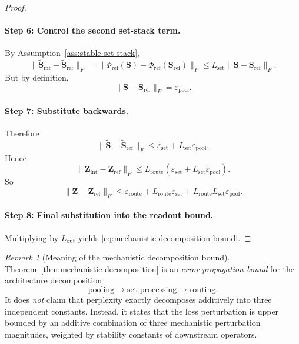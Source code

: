 \documentclass{article}
\theoremstyle{plain}
\theoremstyle{definition}
\theoremstyle{remark}
\newtheorem{remark}[theorem]{Remark}
\begin{document}
\begin{proof}
\paragraph{Step 6: Control the second set-stack term.}
By Assumption~\ref{ass:stable-set-stack},
\[
\|\tilde{\mathbf{S}}_{\mathrm{int}}-\tilde{\mathbf{S}}_{\mathrm{ref}}\|_F
=
\|\Phi_{\mathrm{ref}}(\mathbf{S})-\Phi_{\mathrm{ref}}(\mathbf{S}_{\mathrm{ref}})\|_F
\le
L_{\mathrm{set}}
\|\mathbf{S}-\mathbf{S}_{\mathrm{ref}}\|_F.
\]
But by definition,
\[
\|\mathbf{S}-\mathbf{S}_{\mathrm{ref}}\|_F
=
\varepsilon_{\mathrm{pool}}.
\]

\paragraph{Step 7: Substitute backwards.}
Therefore
\[
\|\tilde{\mathbf{S}}-\tilde{\mathbf{S}}_{\mathrm{ref}}\|_F
\le
\varepsilon_{\mathrm{set}} + L_{\mathrm{set}}\varepsilon_{\mathrm{pool}}.
\]
Hence
\[
\|\mathbf{Z}_{\mathrm{int}}-\mathbf{Z}_{\mathrm{ref}}\|_F
\le
L_{\mathrm{route}}
\left(
\varepsilon_{\mathrm{set}} + L_{\mathrm{set}}\varepsilon_{\mathrm{pool}}
\right).
\]
So
\[
\|\mathbf{Z}-\mathbf{Z}_{\mathrm{ref}}\|_F
\le
\varepsilon_{\mathrm{route}}
+
L_{\mathrm{route}}\varepsilon_{\mathrm{set}}
+
L_{\mathrm{route}}L_{\mathrm{set}}\varepsilon_{\mathrm{pool}}.
\]

\paragraph{Step 8: Final substitution into the readout bound.}
Multiplying by $L_{\mathrm{out}}$ yields \eqref{eq:mechanistic-decomposition-bound}.
\end{proof}

\begin{remark}[Meaning of the mechanistic decomposition bound]
\label{rem:mechanistic-bound-meaning}
Theorem~\ref{thm:mechanistic-decomposition} is an \emph{error propagation bound} for the architecture decomposition
\[
\text{pooling} \to \text{set processing} \to \text{routing}.
\]
It does \emph{not} claim that perplexity exactly decomposes additively into three independent constants. Instead, it states that the loss perturbation is upper bounded by an additive combination of three mechanistic perturbation magnitudes, weighted by stability constants of downstream operators.
\end{remark}

\end{document}
